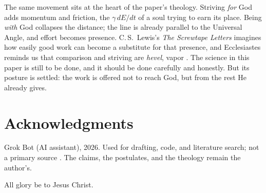 \documentclass[11pt]{article}
\begin{document}
The same movement sits at the heart of the paper's theology. Striving \emph{for} God adds momentum and friction, the $\gamma\,dE/dt$ of a soul trying to earn its place. Being \emph{with} God collapses the distance; the line is already parallel to the Universal Angle, and effort becomes presence. C.\,S.\ Lewis's \emph{The Screwtape Letters} \cite{lewis} imagines how easily good work can become a substitute for that presence, and Ecclesiastes reminds us that comparison and striving are \emph{hevel}, vapor \cite{eccl}. The science in this paper is still to be done, and it should be done carefully and honestly. But its posture is settled: the work is offered not to reach God, but from the rest He already gives.

\section*{Acknowledgments}
Grok Bot (AI assistant), 2026. Used for drafting, code, and literature search; not a primary source \cite{grok}. The claims, the postulates, and the theology remain the author's.

All glory be to Jesus Christ.
\end{document}
